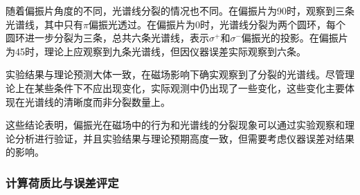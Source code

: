\documentclass[dvipsnames, svgnames,a4paper,11pt]{article}
\begin{document}
\begin{itemize}
		随着偏振片角度的不同，光谱线分裂的情况也不同。在偏振片为90\degree 时，观察到三条光谱线，其中只有$\pi$偏振光透过。在偏振片为0\degree 时，光谱线分裂为两个圆环，每个圆环进一步分裂为三条，总共六条光谱线，表示$\sigma^+$和$\sigma^-$偏振光的投影。在偏振片为45\degree 时，理论上应观察到九条光谱线，但因仪器误差实际观察到六条。
		
		实验结果与理论预测大体一致，在磁场影响下确实观察到了分裂的光谱线。尽管理论上在某些条件下不应出现变化，实际观测中仍出现了一些变化，这些变化主要体现在光谱线的清晰度而非分裂数量上。
		
		这些结论表明，偏振光在磁场中的行为和光谱线的分裂现象可以通过实验观察和理论分析进行验证，并且实验结果与理论预期高度一致，但需要考虑仪器误差对结果的影响。
	\end{itemize}
	
	
	\subsubsection{计算荷质比与误差评定}
\end{document}
